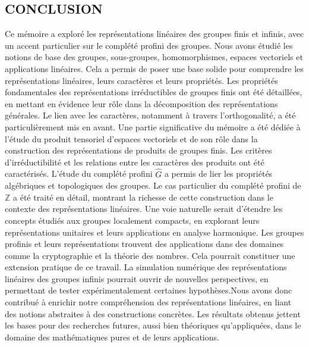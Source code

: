 \documentclass[a4paper, 14pt]{report}
\newcommand{\applyfontsize}{%
	\fontsize{12}{12}\selectfont
}
\begin{document}
\begin{onehalfspace}
{\chapter*{CONCLUSION}
{
	\applyfontsize %
	
Ce mémoire a exploré les représentations linéaires des groupes finis et infinis, avec un accent particulier sur le complété profini des groupes. 
Nous avons étudié les notions de base des groupes, sous-groupes, homomorphismes, espaces vectoriels et applications linéaires. Cela a permis de poser une base solide pour comprendre les représentations linéaires, leurs caractères et leurs propriétés.
Les propriétés fondamentales des représentations irréductibles de groupes finis ont été détaillées, en mettant en évidence leur rôle dans la décomposition des représentations générales. Le lien avec les caractères, notamment à travers l’orthogonalité, a été particulièrement mis en avant.
Une partie significative du mémoire a été dédiée à l'étude du produit tensoriel d'espaces vectoriels et de son rôle dans la construction des représentations de produits de groupes finis. Les critères d’irréductibilité et les relations entre les caractères des produits ont été caractérisés.
 L’étude du complété profini $\widehat{G}$ a permis de lier les propriétés algébriques et topologiques des groupes. Le cas particulier du complété profini de $\mathbb{Z}$ a été traité en détail, montrant la richesse de cette construction dans le contexte des représentations linéaires. Une voie naturelle serait d’étendre les concepts étudiés aux groupes localement compacts, en explorant leurs représentations unitaires et leurs applications en analyse harmonique. Les groupes profinis et leurs représentations trouvent des applications dans des domaines comme la cryptographie et la théorie des nombres. Cela pourrait constituer une extension pratique de ce travail. La simulation numérique des représentations linéaires des groupes infinis pourrait ouvrir de nouvelles perspectives, en permettant de tester expérimentalement certaines hypothèses.Nous avons donc  contribué à enrichir notre compréhension des représentations linéaires, en liant des notions abstraites à des constructions concrètes. Les résultats obtenus jettent les bases pour des recherches futures, aussi bien théoriques qu’appliquées, dans le domaine des mathématiques pures et de leurs applications.
	
}

}
\end{onehalfspace}
\end{document}
